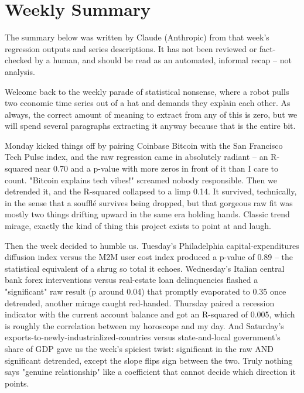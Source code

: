 \section{Weekly Summary}

\begin{tcolorbox}[colback=yellow!10,colframe=black!50,title=AI-Generated Content]
\noindent The summary below was written by Claude (Anthropic) from that week's regression outputs and series descriptions. It has not been reviewed or fact-checked by a human, and should be read as an automated, informal recap -- not analysis.
\end{tcolorbox}

Welcome back to the weekly parade of statistical nonsense, where a robot pulls two economic time series out of a hat and demands they explain each other. As always, the correct amount of meaning to extract from any of this is zero, but we will spend several paragraphs extracting it anyway because that is the entire bit.

Monday kicked things off by pairing Coinbase Bitcoin with the San Francisco Tech Pulse index, and the raw regression came in absolutely radiant -- an R-squared near 0.70 and a p-value with more zeros in front of it than I care to count. "Bitcoin explains tech vibes!" screamed nobody responsible. Then we detrended it, and the R-squared collapsed to a limp 0.14. It survived, technically, in the sense that a soufflé survives being dropped, but that gorgeous raw fit was mostly two things drifting upward in the same era holding hands. Classic trend mirage, exactly the kind of thing this project exists to point at and laugh.

Then the week decided to humble us. Tuesday's Philadelphia capital-expenditures diffusion index versus the M2M user cost index produced a p-value of 0.89 -- the statistical equivalent of a shrug so total it echoes. Wednesday's Italian central bank forex interventions versus real-estate loan delinquencies flashed a "significant" raw result (p around 0.04) that promptly evaporated to 0.35 once detrended, another mirage caught red-handed. Thursday paired a recession indicator with the current account balance and got an R-squared of 0.005, which is roughly the correlation between my horoscope and my day. And Saturday's exports-to-newly-industrialized-countries versus state-and-local government's share of GDP gave us the week's spiciest twist: significant in the raw AND significant detrended, except the slope flips sign between the two. Truly nothing says "genuine relationship" like a coefficient that cannot decide which direction it points.

